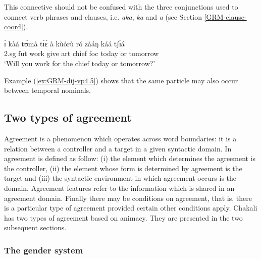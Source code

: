 \begin{exe}
\begin{exe}
\begin{exe}
{\begin{exe}
\begin{exe}
\begin{exe}
\begin{exe}
\begin{exe}
\begin{exe}
\begin{exe}
\begin{xlist}
\begin{exe}
\begin{exe}
\begin{exe}
\begin{exe}
\begin{exe}
\begin{exe}
\begin{exe}
\begin{exe}
\begin{exe}
\begin{exe}
\begin{exe}
\begin{exe}
This  connective
 should not be confused with the three conjunctions used to connect verb
phrases and clauses, i.e. {\it aka}, {\it ka} and {\it a} (see Section
\ref{GRM-clause-coord}).   



\ea\label{ex:GRM-dij-vp4.5}

\gll ɪ̀ kàá tʊ̀mà tɪ̀ɛ̀ à kùórù ró zàáŋ káá tʃɪ́á\\
        {\sc 2.sg} {\sc fut} work give {\sc art} chief  {\sc foc} today or
tomorrow\\
\glt  `Will you work for the chief today or tomorrow?' 
\z



Example (\ref{ex:GRM-dij-vp4.5}) shows that the same
particle may also occur between
 temporal nominals. 





\subsection{Two types of agreement}
\label{sec:GRM-agrrement}

Agreement is a phenomenon which operates
across word boundaries: it is a relation between a controller and a
target in a given syntactic domain. In \citet{Corb04, Corb06} 
  agreement is defined as follow: (i) the element which determines the
  agreement is the controller, (ii) the element whose form is determined by
  agreement is the target and (iii) the syntactic environment in which
  agreement occurs is the domain. Agreement features refer to the information
which is shared in an agreement domain. Finally there may be conditions on
  agreement, that  is, there is a particular type of agreement provided certain
  other conditions apply. Chakali has two types of agreement based on animacy.
They are presented in the two subsequent sections. 

\subsubsection{The gender system}
\label{sec:GRM-gender}



\end{exe}
\end{exe}
\end{exe}
\end{exe}
\end{exe}
\end{exe}
\end{exe}
\end{exe}
\end{exe}
\end{exe}
\end{exe}
\end{exe}
\end{xlist}
\end{exe}
\end{exe}
\end{exe}
\end{exe}
\end{exe}
\end{exe}
\end{exe}}
\end{exe}
\end{exe}
\end{exe}
